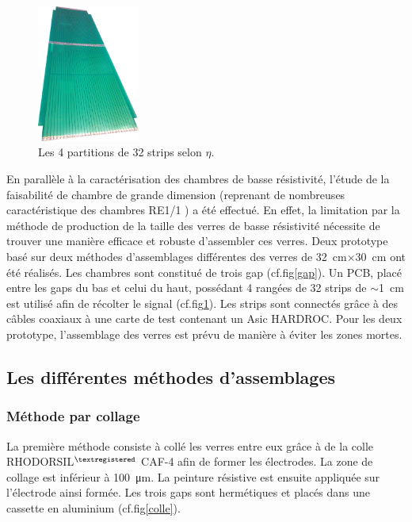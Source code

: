 \begin{figure}
	\vspace*{-0.75cm}
	\centering
	\includegraphics[width=0.30\textwidth]{GLA/strips.jpg}
	\caption{Les \num{4} partitions de \num{32} strips selon $\eta$.}
	\label{strips}
\end{figure}

En parallèle à la caractérisation des chambres de basse résistivité, l'étude de la faisabilité de chambre de grande dimension (reprenant de nombreuses caractéristique des chambres RE1/1 \cite{gapss}) a été effectué. En effet, la limitation par la méthode de production de la taille des verres de basse résistivité nécessite de trouver une manière efficace et robuste d'assembler ces verres.  Deux prototype basé sur deux méthodes d'assemblages différentes des verres de \SI{32}{\centi\meter}$\times$\SI{30}{\centi\meter} ont été réalisés. Les chambres sont constitué de trois gap (cf.fig\ref{gap}). Un PCB, placé entre les gaps du bas et celui du haut, possédant \num{4} rangées de \num{32} strips de $\sim$\SI{1}{\centi\meter} est utilisé afin de récolter le signal (cf.fig\ref{strips}). Les strips sont connectés grâce à des câbles coaxiaux à une carte de test contenant un Asic HARDROC. Pour les deux prototype, l'assemblage des verres est prévu de manière à éviter les zones mortes.


\subsection{Les différentes méthodes d'assemblages} 
\subsubsection{Méthode par collage}
La première méthode consiste à collé les verres entre eux grâce à de la colle RHODORSIL$^{\tiny{\textregistered}}$
 CAF-4 afin de former les électrodes. La zone de collage est inférieur à \SI{100}{\micro\meter}. La peinture résistive est ensuite appliquée sur l'électrode ainsi formée. Les trois gaps sont hermétiques et placés dans une cassette en aluminium (cf.fig\ref{colle}).
 
